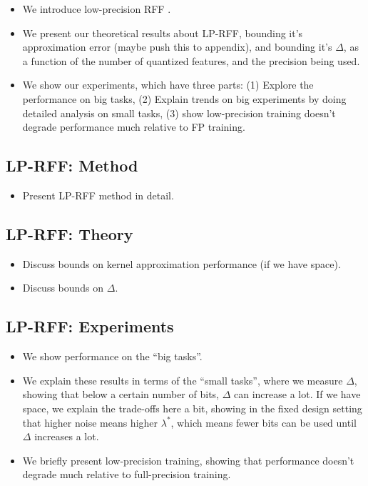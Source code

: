 \begin{itemize}
	\item We introduce low-precision RFF .
	\item We present our theoretical results about LP-RFF, bounding it's approximation error (maybe push this to appendix), and bounding it's $\Delta$, as a function of the number of quantized features, and the precision being used.
	\item We show our experiments, which have three parts: (1) Explore the performance on big tasks, (2) Explain trends on big experiments by doing detailed analysis on small tasks, (3) show low-precision training doesn't degrade performance much relative to FP training.
\end{itemize}

\subsection{LP-RFF: Method}
\begin{itemize}
	\item Present LP-RFF method in detail.
\end{itemize}
\subsection{LP-RFF: Theory}
\begin{itemize}
	\item Discuss bounds on kernel approximation performance (if we have space).
	\item Discuss bounds on $\Delta$.
\end{itemize}
\subsection{LP-RFF: Experiments}
\begin{itemize}
	\item We show performance on the ``big tasks''.
	\item We explain these results in terms of the ``small tasks'', where we measure $\Delta$, showing that below a certain number of bits, $\Delta$ can increase a lot.  If we have space, we explain the trade-offs here a bit, showing in the fixed design setting that higher noise means higher $\lambda^*$, which means fewer bits can be used until $\Delta$ increases a lot.
	\item We briefly present low-precision training, showing that performance doesn't degrade much relative to full-precision training.
\end{itemize}
